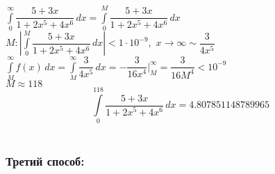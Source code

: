 \documentclass[12pt,a4paper]{article}
\begin{document}
$\displaystyle\int\limits_0^\infty \dfrac{5+3x}{1+2x^5+4x^6}\,dx=\displaystyle\int\limits_0^M \dfrac{5+3x}{1+2x^5+4x^6}\,dx$\\
$M:\left|\displaystyle\int\limits_0^M \dfrac{5+3x}{1+2x^5+4x^6}\,dx\right|<1\cdot10^{-9}$,~$x\rightarrow\infty\sim\dfrac{3}{4x^5}$\\
$\displaystyle\int \limits_M^{\infty}f(x)\,dx=\int \limits_M^{\infty}\dfrac{3}{4x^5}\,dx=-\dfrac{3}{16x^4}\bigg|_M^\infty=\dfrac{3}{16M^4}<10^{-9}$\\

$M\approx118$\\
$$\displaystyle\int\limits_0^{118} \dfrac{5+3x}{1+2x^5+4x^6}\,dx=4.807851148789965$$\\

\subsubsection*{Третий способ:}
\end{document}
